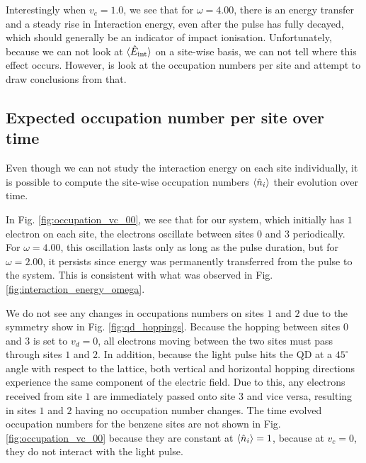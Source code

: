 Interestingly when $v_c = 1.0$, we see that for $\omega=4.00$, there is an energy transfer and a steady rise in Interaction energy, even after the pulse has fully decayed, which should generally be an indicator of impact ionisation. Unfortunately, because we can not look at $\braket{\hat{E}_{\text{int}}}$ on a site-wise basis, we can not tell where this effect occurs. However, is look at the occupation numbers per site and attempt to draw conclusions from that.

\subsection{Expected occupation number per site over time}
Even though we can not study the interaction energy on each site individually, it is possible to compute the site-wise occupation numbers $\braket{\hat{n}_i}$ their evolution over time.
\medskip

In Fig. \ref{fig:occupation_vc_00}, we see that for our system, which initially has $1$ electron on each site, the electrons oscillate between sites $0$ and $3$ periodically. For $\omega=4.00$, this oscillation lasts only as long as the pulse duration, but for $\omega=2.00$, it persists since energy was permanently transferred from the pulse to the system. This is consistent with what was observed in Fig. \ref{fig:interaction_energy_omega}.
\medskip

We do not see any changes in occupations numbers on sites $1$ and $2$ due to the symmetry show in Fig. \ref{fig:qd_hoppings}. Because the hopping between sites $0$ and $3$ is set to $v_d = 0$, all electrons moving between the two sites must pass through sites $1$ and $2$. In addition, because the light pulse hits the QD at a $45^\circ$ angle with respect to the lattice, both vertical and horizontal hopping directions experience the same component of the electric field. Due to this, any electrons received from site $1$ are immediately passed onto site $3$ and vice versa, resulting in sites $1$ and $2$ having no occupation number changes. The time evolved occupation numbers for the benzene sites are not shown in Fig. \ref{fig:occupation_vc_00} because they are constant at $\braket{\hat{n}_i} = 1$, because at $v_c = 0$, they do not interact with the light pulse.
\medskip

